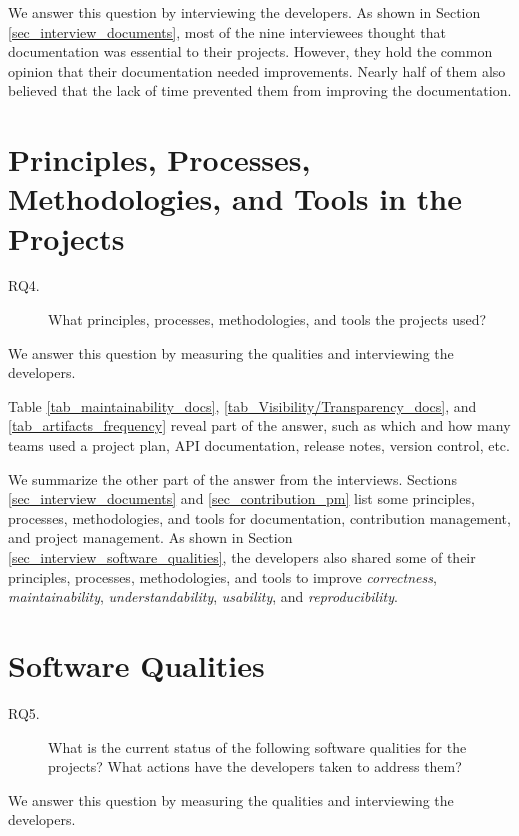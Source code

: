 We answer this question by interviewing the developers. As shown in Section \ref{sec_interview_documents}, most of the nine interviewees thought that documentation was essential to their projects. However, they hold the common opinion that their documentation needed improvements. Nearly half of them also believed that the lack of time prevented them from improving the documentation.

\section{Principles, Processes, Methodologies, and Tools in the Projects}
\label{sec_rq4_PPMT}
\begin{description}\item[RQ4.] What principles, processes, methodologies, and tools the projects used?\end{description}

We answer this question by measuring the qualities and interviewing the developers.

Table \ref{tab_maintainability_docs}, \ref{tab_Visibility/Transparency_docs}, and \ref{tab_artifacts_frequency} reveal part of the answer, such as which and how many teams used a project plan, API documentation, release notes, version control, etc.

We summarize the other part of the answer from the interviews. Sections \ref{sec_interview_documents} and \ref{sec_contribution_pm} list some principles, processes, methodologies, and tools for documentation, contribution management, and project management. As shown in Section \ref{sec_interview_software_qualities}, the developers also shared some of their principles, processes, methodologies, and tools to improve \textit{correctness}, \textit{maintainability}, \textit{understandability}, \textit{usability}, and \textit{reproducibility}.

\section{Software Qualities}
\label{sec_rq5_qualities}
\begin{description}\item[RQ5.] What is the current status of the following software qualities for the projects? What actions have the developers taken to address them?\end{description}

We answer this question by measuring the qualities and interviewing the developers.

